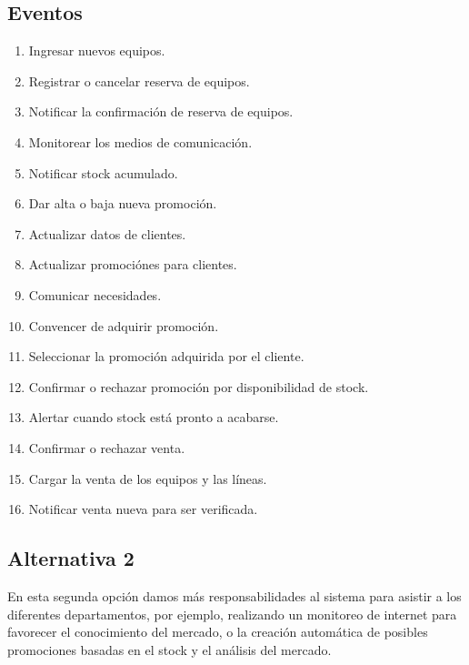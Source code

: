 \subsection{Eventos}

\begin{enumerate}

  \item Ingresar nuevos equipos.
  \item Registrar o cancelar reserva de equipos.
  \item Notificar la confirmación de reserva de equipos.
  \item Monitorear los medios de comunicación.
  \item Notificar stock acumulado.
  \item Dar alta o baja nueva promoción.
  \item Actualizar datos de clientes.
  \item Actualizar promociónes para clientes.
  \item Comunicar necesidades.
  \item Convencer de adquirir promoción.
  \item Seleccionar la promoción adquirida por el cliente.
  \item Confirmar o rechazar promoción por disponibilidad de stock.
  \item Alertar cuando stock está pronto a acabarse.
  \item Confirmar o rechazar venta.
  \item Cargar la venta de los equipos y las líneas.
  \item Notificar venta nueva para ser verificada.

\end{enumerate}

\subsection{Alternativa 2}

En esta segunda opción damos más responsabilidades al sistema para asistir a los 
diferentes departamentos, por ejemplo, realizando un monitoreo de internet para 
favorecer el conocimiento del mercado, o la creación automática de posibles 
promociones basadas en el stock y el análisis del mercado.

